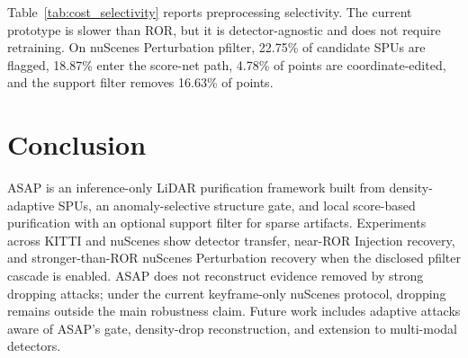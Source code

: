 \documentclass[conference]{IEEEtran}
\begin{document}
Table~\ref{tab:cost_selectivity} reports preprocessing selectivity. The current prototype is slower than ROR, but it is detector-agnostic and does not require retraining. On nuScenes Perturbation pfilter, 22.75\% of candidate SPUs are flagged, 18.87\% enter the score-net path, 4.78\% of points are coordinate-edited, and the support filter removes 16.63\% of points.

\section{Conclusion}

ASAP is an inference-only LiDAR purification framework built from density-adaptive SPUs, an anomaly-selective structure gate, and local score-based purification with an optional support filter for sparse artifacts. Experiments across KITTI and nuScenes show detector transfer, near-ROR Injection recovery, and stronger-than-ROR nuScenes Perturbation recovery when the disclosed pfilter cascade is enabled. ASAP does not reconstruct evidence removed by strong dropping attacks; under the current keyframe-only nuScenes protocol, dropping remains outside the main robustness claim. Future work includes adaptive attacks aware of ASAP's gate, density-drop reconstruction, and extension to multi-modal detectors.



\end{document}
